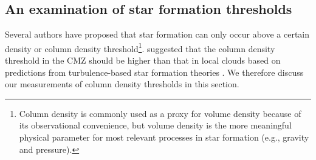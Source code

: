 \documentclass[twocolumn]{aastex61}
\newcommand{\dsgrb}{\ensuremath{8.4\textrm{~kpc}}\xspace}
\begin{document}
% 

\subsection{An examination of star formation thresholds}
\label{sec:thresholds}
Several authors \citep[e.g.,][]{Lada2010a,Heiderman2010a} have proposed that star
formation can only occur above a certain density or column density
threshold\footnote{Column density is commonly used as a proxy for volume
density because of its observational convenience, but volume density is the
more meaningful physical parameter for most relevant processes in star formation
(e.g., gravity and pressure).}.  \citet{Kruijssen2014c} suggested that the
column density threshold in the CMZ should be higher than that in local clouds
based on predictions from turbulence-based star formation theories
\citep{Krumholz2005c,Padoan2011b}.
We therefore discuss our measurements of column density thresholds in this
section.



\end{document}
